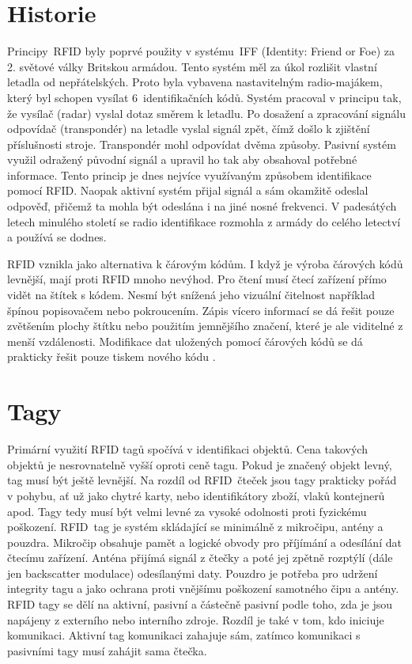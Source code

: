 \section{Historie}
Principy~RFID byly poprvé použity v systému~IFF (Identity: Friend or Foe) za 2. světové války Britskou armádou. Tento systém měl za úkol rozlišit vlastní letadla od nepřátelských. Proto byla vybavena nastavitelným {radio-majákem}, který byl schopen vysílat 6~identifikačních kódů. Systém pracoval v principu tak, že vysílač (radar) vyslal dotaz směrem k letadlu. Po dosažení a zpracování signálu odpovídač (transpondér) na letadle vyslal signál zpět, čímž došlo k zjištění příslušnosti stroje. Transpondér mohl odpovídat dvěma způsoby. Pasivní systém využil odražený původní signál a upravil ho tak aby obsahoval potřebné informace. Tento princip je dnes nejvíce využívaným způsobem identifikace pomocí RFID. Naopak aktivní systém přijal signál a sám okamžitě odeslal odpověď, přičemž ta mohla být odeslána i na jiné nosné frekvenci. V padesátých letech minulého století se radio identifikace rozmohla z armády do celého letectví a používá se dodnes. %
\par
RFID vznikla jako alternativa k čárovým kódům. I když je výroba čárových kódů levnější, mají proti RFID mnoho nevýhod. Pro čtení musí čtecí zařízení přímo vidět na štítek s kódem. Nesmí být snížená jeho vizuální čitelnost například špínou popisovačem nebo pokroucením. Zápis vícero informací se dá řešit pouze zvětšením plochy štítku nebo použitím jemnějšího značení, které je ale viditelné z menší vzdálenosti. Modifikace dat uložených pomocí čárových kódů se dá prakticky řešit pouze tiskem nového kódu \cite{The_RF_in_RFID}\cite{Emulator_UHD_RFID_Tagu}.

\section{Tagy}
Primární využití RFID tagů spočívá v identifikaci objektů. Cena takových objektů je nesrovnatelně vyšší oproti ceně tagu. Pokud je značený objekt levný, tag musí být ještě levnější. Na rozdíl od RFID~čteček jsou tagy prakticky pořád v pohybu, ať už jako chytré karty, nebo identifikátory zboží, vlaků kontejnerů apod. Tagy tedy musí být velmi levné za vysoké odolnosti proti fyzickému poškození\cite{The_RF_in_RFID}.
RFID~tag je systém skládající se minimálně z mikročipu, antény a pouzdra. Mikročip obsahuje pamět a logické obvody pro příjímání a odesílání dat čtecímu zařízení. Anténa přijímá signál z čtečky a poté jej zpětně rozptýlí (dále jen backscatter modulace) odesílanými daty. Pouzdro je potřeba pro udržení integrity tagu a jako ochrana proti vnějšímu poškození samotného čipu a antény\cite{RFID_explained}.
RFID tagy se dělí na aktivní, pasivní a částečně pasivní podle toho, zda je jsou napájeny z externího nebo interního zdroje\cite{The_RF_in_RFID}. Rozdíl je také v tom, kdo iniciuje komunikaci. Aktivní tag komunikaci zahajuje sám, zatímco komunikaci s pasivními tagy musí zahájit sama čtečka\cite{Hazardous_areas}. 

